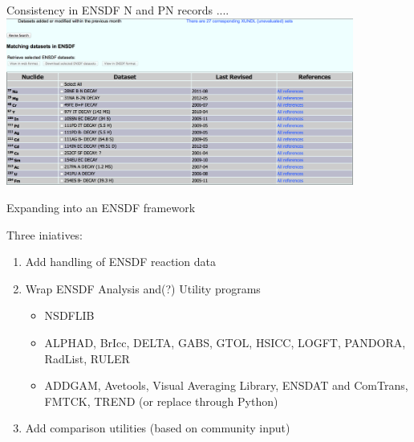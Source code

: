 \documentclass[xcolor=x11names,compress]{beamer}
\renewcommand{\(}{\begin{columns}}
\renewcommand{\)}{\end{columns}}
\newcommand{\<}[1]{\begin{column}{#1}}
\renewcommand{\>}{\end{column}}
\begin{document}
\begin{frame}{Consistency in ENSDF N and PN records ....}
    \includegraphics[height=5.5cm]{ensdf_updates}
\end{frame}
\begin{frame}{Expanding into an ENSDF framework}

    Three iniatives:
    \begin{enumerate}
      \item Add handling of ENSDF \alert{reaction} data
       
      \item Wrap ENSDF \alert{Analysis} and(?) \alert{Utility} programs
      \begin{itemize}
        \item NSDFLIB
        \item ALPHAD, BrIcc, DELTA, GABS, GTOL, HSICC, LOGFT, PANDORA,
        RadList, RULER
        \item ADDGAM, Avetools, Visual Averaging Library, ENSDAT and 
        ComTrans, FMTCK, TREND (or replace through Python)
      \end{itemize}
        
      \item Add comparison utilities (based on \alert{community input})
    \end{enumerate}
    
\end{frame}

\end{document}
